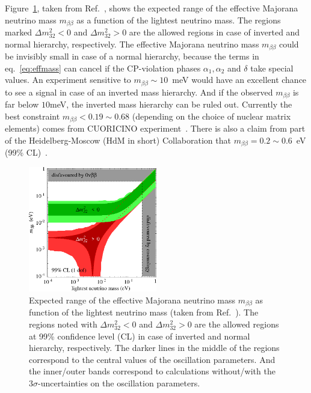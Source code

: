 Figure~\ref{fig:m2bVSlightest}, taken from Ref.~\cite{Str05}, shows the expected range of the effective Majorana neutrino mass $m_{\beta\beta}$ as a function of the lightest neutrino mass. The regions marked $\Delta m^{2}_{32}<0$ and $\Delta m^{2}_{32}>0$ are the allowed regions in case of inverted and normal hierarchy, respectively. The effective Majorana neutrino mass $m_{\beta\beta}$ could be invisibly small in case of a normal hierarchy, because the terms in eq.~\ref{eq:effmass} can cancel if the CP-violation phases $\alpha_{1}, \alpha_{2}$ and $\delta$ take special values. An experiment sensitive to $ m_{\beta\beta} \sim 10$~meV would have an excellent chance to see a signal in case of an inverted mass hierarchy. And if the observed $m_{\beta\beta}$ is far below $10$meV, the inverted mass hierarchy can be ruled out. Currently the best constraint $m_{\beta\beta}<0.19 \sim 0.68$ (depending on the choice of nuclear matrix elements) comes from CUORICINO experiment~\cite{Cuo08}. There is also a claim from part of the Heidelberg-Moscow (HdM in short) Collaboration that $m_{\beta\beta} = 0.2 \sim 0.6$~eV (99\% CL)~\cite{Hei04}.
\begin{figure}[tbhp]
  \centering
  \includegraphics[width=0.5\textwidth]{m2bVSlightest.eps}  
  \caption{Expected range of the effective Majorana neutrino mass     $m_{\beta\beta}$ as function of the lightest neutrino mass (taken     from Ref.~\cite{Str05}). The regions noted with $\Delta     m^{2}_{32}<0$ and $\Delta m^{2}_{32}>0$ are the allowed regions at     99\% confidence level (CL) in case of inverted and normal     hierarchy, respectively. The darker lines in the middle of the     regions correspond to the central values of the oscillation     parameters. And the inner/outer bands correspond to calculations     without/with the $3 \sigma$-uncertainties on the oscillation     parameters.}
  \label{fig:m2bVSlightest}
\end{figure}

